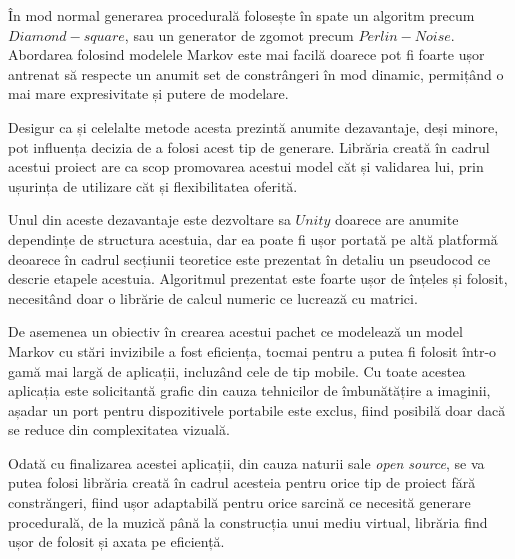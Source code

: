 În mod normal generarea procedurală folosește în spate un algoritm precum $Diamond-square$, sau un generator de zgomot precum $Perlin-Noise$. Abordarea folosind modelele Markov este mai facilă doarece pot fi foarte ușor antrenat să respecte un anumit set de constrângeri în mod dinamic, permițând o mai mare expresivitate și putere de modelare. \par

Desigur ca și celelalte metode acesta prezintă anumite dezavantaje, deși minore, pot influența decizia de a folosi acest tip de generare. Librăria creată în cadrul acestui proiect are ca scop promovarea acestui model căt și validarea lui, prin ușurința de utilizare căt și flexibilitatea oferită.\par

Unul din aceste dezavantaje este dezvoltare sa $Unity$ doarece are anumite dependințe de structura acestuia, dar ea poate fi ușor portată pe altă platformă deoarece în cadrul secțiunii teoretice este prezentat în detaliu un pseudocod ce descrie etapele acestuia. Algoritmul prezentat este foarte ușor de înțeles și folosit, necesitând doar o librărie de calcul numeric ce lucrează cu matrici.\par  

De asemenea un obiectiv în crearea acestui pachet ce modelează un model Markov cu stări invizibile a fost eficiența, tocmai pentru a putea fi folosit într-o gamă mai largă de aplicații, incluzând cele de tip mobile. Cu toate acestea aplicația este solicitantă grafic din cauza tehnicilor de îmbunătățire a imaginii, așadar un port pentru dispozitivele portabile este exclus, fiind posibilă doar dacă se reduce din complexitatea vizuală.\par

Odată cu finalizarea acestei aplicații, din cauza naturii sale \textit{open source}, se va putea folosi librăria creată în cadrul acesteia pentru orice tip de proiect fără constrăngeri, fiind ușor adaptabilă pentru orice sarcină ce necesită generare procedurală, de la muzică până la construcția unui mediu virtual, librăria find ușor de folosit și axata pe eficiență.\par
